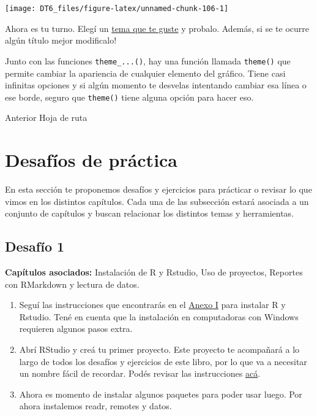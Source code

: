 \documentclass[
  openany]{book}
\begin{document}
\begin{center}\texttt{[image: DT6\_files/figure-latex/unnamed-chunk-106-1]} \end{center}

Ahora es tu turno.
Elegí un \href{https://es.r4ds.hadley.nz/images/visualization-themes.png}{tema que te guste} y probalo.
Además, si se te ocurre algún título mejor modificalo!

Junto con las funciones \texttt{theme\_...()}, hay una función llamada \texttt{theme()} que permite cambiar la apariencia de cualquier elemento del gráfico.
Tiene casi infinitas opciones y si algún momento te desvelas intentando cambiar esa línea o ese borde, seguro que \texttt{theme()} tiene alguna opción para hacer eso.

Anterior Hoja de ruta

\hypertarget{desafuxedos-de-pruxe1ctica}{%
\chapter{Desafíos de práctica}\label{desafuxedos-de-pruxe1ctica}}

En esta sección te proponemos desafíos y ejercicios para prácticar o revisar lo que vimos en los distintos capítulos. Cada una de las subsección estará asociada a un conjunto de capítulos y buscan relacionar los distintos temas y herramientas.

\hypertarget{desafuxedo-1}{%
\section{Desafío 1}\label{desafuxedo-1}}

\textbf{Capítulos asociados:} Instalación de R y Rstudio, Uso de proyectos, Reportes con RMarkdown y lectura de datos.

\begin{enumerate}
\def\labelenumi{\arabic{enumi}.}
\item
  Seguí las instrucciones que encontrarás en el \href{}{Anexo I} para instalar R y Rstudio. Tené en cuenta que la instalación en computadoras con Windows requieren algunos pasos extra.
\item
  Abrí RStudio y creá tu primer proyecto. Este proyecto te acompañará a lo largo de todos los desafíos y ejercicios de este libro, por lo que va a necesitar un nombre fácil de recordar. Podés revisar las instrucciones \href{}{acá}.
\item
  Ahora es momento de instalar algunos paquetes para poder usar luego. Por ahora instalemos readr, remotes y datos.
\end{enumerate}
\end{document}
